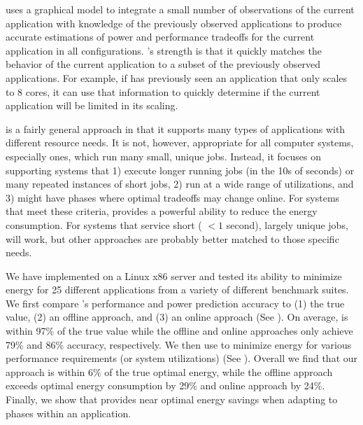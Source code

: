 \SYSTEMLEO{} uses a graphical model to integrate a small number of
observations of the current application with knowledge of the
previously observed applications to produce accurate estimations of
power and performance tradeoffs for the current application in all
configurations.  \SYSTEMLEO{}'s strength is that it quickly matches the
behavior of the current application to a subset of the previously
observed applications.  For example, if \SYSTEMLEO{} has previously seen
an application that only scales to 8 cores, it can use that
information to quickly determine if the current application will be
limited in its scaling.


\SYSTEMLEO{} is a fairly general approach in that it supports many types
of applications with different resource needs.  It is not, however,
appropriate for all computer systems, especially ones, which run many
small, unique jobs.  Instead, it focuses on supporting systems that 1)
execute longer running jobs (in the 10s of seconds) or many repeated
instances of short jobs, 2) run at a wide range of utilizations, and
3) might have phases where optimal tradeoffs may change online.  For
systems that meet these criteria, \SYSTEMLEO{} provides a powerful
ability to reduce the energy consumption.  For systems that service
short ( $< 1$ second), largely unique jobs, \SYSTEMLEO{} will work, but
other approaches are probably better matched to those specific needs.

We have implemented \SYSTEMLEO{} on a Linux x86 server and tested its
ability to minimize energy for 25 different applications from a
variety of different benchmark suites.  We first compare \SYSTEMLEO{}'s
performance and power prediction accuracy to (1) the true value, (2)
an offline approach, and (3) an online approach (See
).  On average, \SYSTEMLEO{} is within 97\% of the true
value while the offline and online approaches only achieve 79\% and
86\% accuracy, respectively.  We then use \SYSTEMLEO{} to minimize energy
for various performance requirements (or system utilizations) (See
).  Overall we find that our approach is
within 6\% of the true optimal energy, while the offline approach
exceeds optimal energy consumption by 29\% and online approach by
24\%.  Finally, we show that \SYSTEMLEO{} provides near optimal energy
savings when adapting to phases within an application.


